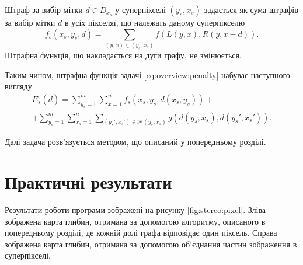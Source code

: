 Штраф за вибір мітки $d \in D_{x_s}$ у суперпікселі $\left(y_s, x_s \right)$
задається як сума штрафів за вибір мітки $d$ в усіх пікселяї,
що належать даному суперпікселю
\begin{equation*}
    f_s \left(x_s, y_s, d \right)
    = \sum \limits_{\left(y, x \right) \in \left(y_s, x_s \right)}
        f \left(L \left(y, x\right), R \left(y, x - d \right) \right).
\end{equation*}
Штрафна функція, що накладається на дуги графу, не змінюється.

Таким чином,
штрафна функція задачі \ref{eq:overview:penalty} набуває наступного вигляду
\begin{equation}
\begin{split}
    E_s \left( \overline{d} \right)
    = \sum \limits_{y_s = 1}^{m}
        \sum \limits_{x = 1}^{n}
            f_s \left(x_s, y_s, d \left( x_s, y_s \right) \right) + \\
    + \sum \limits_{y_s = 1}^{m}
        \sum \limits_{x_s = 1}^{n}
            \sum \limits_{\left( y_s', x_s' \right) \in \mathcal{N} \left( y_s, x_s \right)}
            g \left(
                d \left( y_s, x_s \right), d \left( y_s', x_s' \right)
            \right).
\end{split}
\end{equation}

Далі задача розв'язується методом, що описаний у попередньому розділі.

\section{Практичні результати}

Результати роботи програми зображені на рисунку \ref{fig:stereo:pixel}.
Зліва зображена карта глибин, отримана за допомогою алгоритму,
описаного в попередньому розділі, де кожній долі графа відповідає один піксель.
Справа зображена карта глибин,
отримана за допомогою об'єднання частин зображення в суперпікселі.

